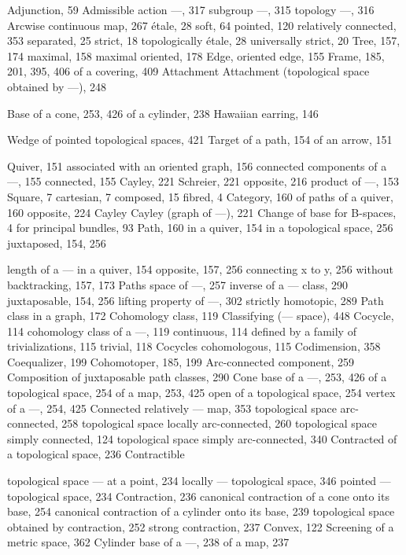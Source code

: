 

Adjunction, 59 Admissible action ---, 317 subgroup ---, 315 topology ---, 316 Arcwise continuous map, 267 étale, 28 soft, 64 pointed, 120 relatively connected, 353 separated, 25 strict, 18 topologically étale, 28 universally strict, 20 Tree, 157, 174 maximal, 158 maximal oriented, 178 Edge, oriented edge, 155 Frame, 185, 201, 395, 406 of a covering, 409 Attachment Attachment (topological space obtained by ---), 248


Base of a cone, 253, 426 of a cylinder, 238 Hawaiian earring, 146

Wedge of pointed topological spaces, 421 Target of a path, 154 of an arrow, 151


Quiver, 151 associated with an oriented graph, 156 connected components of a ---, 155 connected, 155 Cayley, 221 Schreier, 221 opposite, 216 product of ---, 153 Square, 7 cartesian, 7 composed, 15 fibred, 4 Category, 160 of paths of a quiver, 160 opposite, 224 Cayley Cayley (graph of ---), 221 Change of base for B-spaces, 4 for principal bundles, 93 Path, 160 in a quiver, 154 in a topological space, 256 juxtaposed, 154, 256

length of a --- in a quiver, 154 opposite, 157, 256 connecting x to y, 256 without backtracking, 157, 173 Paths space of ---, 257 inverse of a --- class, 290 juxtaposable, 154, 256 lifting property of ---, 302 strictly homotopic, 289 Path class in a graph, 172 Cohomology class, 119 Classifying (--- space), 448 Cocycle, 114 cohomology class of a ---, 119 continuous, 114 defined by a family of trivializations, 115 trivial, 118 Cocycles cohomologous, 115 Codimension, 358 Coequalizer, 199 Cohomotoper, 185, 199 Arc-connected component, 259 Composition of juxtaposable path classes, 290 Cone base of a ---, 253, 426 of a topological space, 254 of a map, 253, 425 open of a topological space, 254 vertex of a ---, 254, 425 Connected relatively --- map, 353 topological space arc-connected, 258 topological space locally arc-connected, 260 topological space simply connected, 124 topological space simply arc-connected, 340 Contracted of a topological space, 236 Contractible

topological space --- at a point, 234 locally --- topological space, 346 pointed --- topological space, 234 Contraction, 236 canonical contraction of a cone onto its base, 254 canonical contraction of a cylinder onto its base, 239 topological space obtained by contraction, 252 strong contraction, 237 Convex, 122 Screening of a metric space, 362 Cylinder base of a ---, 238 of a map, 237

